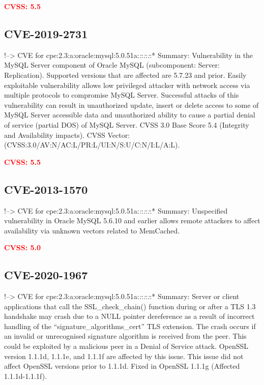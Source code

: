 \documentclass[a4paper, 12pt]{article}
\begin{document}
\textbf{\textcolor{red}{CVSS: 5.5}}

\hypertarget{cve-2019-2731}{%
\subsection{CVE-2019-2731}\label{cve-2019-2731}}

!--\textgreater{} CVE for
cpe:2.3:a:oracle:mysql:5.0.51a:\emph{:}:\emph{:}:\emph{:}:* Summary:
Vulnerability in the MySQL Server component of Oracle MySQL
(subcomponent: Server: Replication). Supported versions that are
affected are 5.7.23 and prior. Easily exploitable vulnerability allows
low privileged attacker with network access via multiple protocols to
compromise MySQL Server. Successful attacks of this vulnerability can
result in unauthorized update, insert or delete access to some of MySQL
Server accessible data and unauthorized ability to cause a partial
denial of service (partial DOS) of MySQL Server. CVSS 3.0 Base Score 5.4
(Integrity and Availability impacts). CVSS Vector:
(CVSS:3.0/AV:N/AC:L/PR:L/UI:N/S:U/C:N/I:L/A:L).

\textbf{\textcolor{red}{CVSS: 5.5}}

\hypertarget{cve-2013-1570}{%
\subsection{CVE-2013-1570}\label{cve-2013-1570}}

!--\textgreater{} CVE for
cpe:2.3:a:oracle:mysql:5.0.51a:\emph{:}:\emph{:}:\emph{:}:* Summary:
Unspecified vulnerability in Oracle MySQL 5.6.10 and earlier allows
remote attackers to affect availability via unknown vectors related to
MemCached.

\textbf{\textcolor{red}{CVSS: 5.0}}

\hypertarget{cve-2020-1967}{%
\subsection{CVE-2020-1967}\label{cve-2020-1967}}

!--\textgreater{} CVE for
cpe:2.3:a:oracle:mysql:5.0.51a:\emph{:}:\emph{:}:\emph{:}:* Summary:
Server or client applications that call the SSL\_check\_chain() function
during or after a TLS 1.3 handshake may crash due to a NULL pointer
dereference as a result of incorrect handling of the
``signature\_algorithms\_cert'' TLS extension. The crash occurs if an
invalid or unrecognised signature algorithm is received from the peer.
This could be exploited by a malicious peer in a Denial of Service
attack. OpenSSL version 1.1.1d, 1.1.1e, and 1.1.1f are affected by this
issue. This issue did not affect OpenSSL versions prior to 1.1.1d. Fixed
in OpenSSL 1.1.1g (Affected 1.1.1d-1.1.1f).
\end{document}
